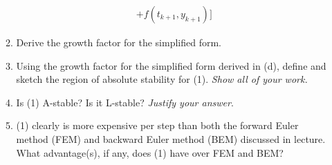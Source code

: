 \documentclass{article}
\begin{document}
\begin{enumerate}
\begin{enumerate}
\begin{align*}
                + f(t_{k+1}, y_{k+1})]
                \end{align*}
            \item Derive the growth factor for the simplified form.
            \item Using the growth factor for the simplified form derived
                in (d), define and sketch the region of absolute stability
                for (1). \textit{Show all of your work.}
            \item Is (1) A-stable? Is it L-stable? \textit{Justify your 
                answer}.
            \item (1) clearly is more expensive per step than both the
                forward Euler method (FEM) and backward Euler method
                (BEM) discussed in lecture. What advantage(s), if any,
                does (1) have over FEM and BEM?
        \end{enumerate}
\end{enumerate}
\end{document}
